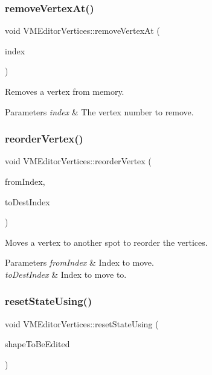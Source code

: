 \subsubsection{\texorpdfstring{removeVertexAt()}{removeVertexAt()}}
{\footnotesize\ttfamily void V\+M\+Editor\+Vertices\+::remove\+Vertex\+At (\begin{DoxyParamCaption}\item[{int}]{index }\end{DoxyParamCaption})}



Removes a vertex from memory. 


\begin{DoxyParams}{Parameters}
{\em index} & The vertex number to remove. \\
\hline
\end{DoxyParams}
\mbox{\label{class_v_m_editor_vertices_a33f91a61158bbac2b540ca80ac75eaf1}} 
\subsubsection{\texorpdfstring{reorderVertex()}{reorderVertex()}}
{\footnotesize\ttfamily void V\+M\+Editor\+Vertices\+::reorder\+Vertex (\begin{DoxyParamCaption}\item[{int}]{from\+Index,  }\item[{int}]{to\+Dest\+Index }\end{DoxyParamCaption})}



Moves a vertex to another spot to reorder the vertices. 


\begin{DoxyParams}{Parameters}
{\em from\+Index} & Index to move. \\
\hline
{\em to\+Dest\+Index} & Index to move to. \\
\hline
\end{DoxyParams}
\mbox{\label{class_v_m_editor_vertices_ada7b06ed4146f561c1472148a994a871}} 
\subsubsection{\texorpdfstring{resetStateUsing()}{resetStateUsing()}\hspace{0.1cm}{\footnotesize\ttfamily [1/2]}}
{\footnotesize\ttfamily void V\+M\+Editor\+Vertices\+::reset\+State\+Using (\begin{DoxyParamCaption}\item[{\mbox{\hyperlink{class_i_shape}{I\+Shape}} $\ast$}]{shape\+To\+Be\+Edited }\end{DoxyParamCaption})}



